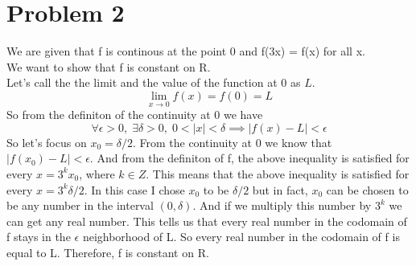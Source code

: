 \documentclass{article}
\begin{document}
\section*{Problem 2}
We are given that f is continous at the point 0 and f(3x) = f(x) for all x. \\
We want to show that f is constant on R. \\
Let's call the the limit and the value of the function at 0 as \(L\). \\
\[
   \lim_{x \rightarrow 0} f(x) = f(0) = L
\]
So from the definiton of the continuity at 0 we have
\[
   \forall \epsilon > 0, \; \exists \delta > 0, \; 0 < |x| < \delta \implies |f(x) - L| < \epsilon
\]
So let's focus on \(x_0 = \delta / 2\). From the continuity at 0 we know that \(|f(x_0) - L| < \epsilon\).
And from the definiton of f, the above inequality is satisfied for every \(x = 3^k x_0\), where \(k \in Z\).
This means that the above inequality is satisfied for every \(x = 3^k \delta / 2\). In this case I chose \(x_0\) to be \(\delta / 2\)
but in fact, \(x_0\) can be chosen to be any number in the interval \((0,\delta)\). And if we multiply this number by \(3^k\) we can get any real number.
This tells us that every real number in the codomain of f stays in the \(\epsilon\) neighborhood of L.
So every real number in the codomain of f is equal to L. Therefore, f is constant on R.
\end{document}
